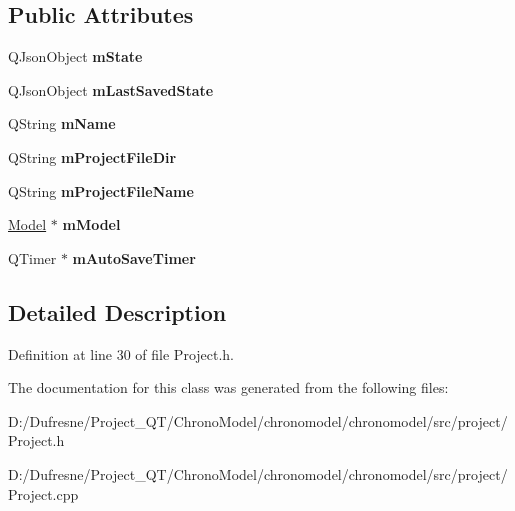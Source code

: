 \subsection*{Public Attributes}
\begin{DoxyCompactItemize}
\item 
\hypertarget{class_project_ad3a4b68e4e6c8145100cffcd846f9fa9}{Q\-Json\-Object {\bfseries m\-State}}\label{class_project_ad3a4b68e4e6c8145100cffcd846f9fa9}

\item 
\hypertarget{class_project_aaca6e90270eb9e26e8b91cdf7ca091c7}{Q\-Json\-Object {\bfseries m\-Last\-Saved\-State}}\label{class_project_aaca6e90270eb9e26e8b91cdf7ca091c7}

\item 
\hypertarget{class_project_ae6ca5c89b55a73bebd4ceb65e7b3181f}{Q\-String {\bfseries m\-Name}}\label{class_project_ae6ca5c89b55a73bebd4ceb65e7b3181f}

\item 
\hypertarget{class_project_a955938a4ac1984fb4f8678232660f32d}{Q\-String {\bfseries m\-Project\-File\-Dir}}\label{class_project_a955938a4ac1984fb4f8678232660f32d}

\item 
\hypertarget{class_project_a23a11e16ff7bedaf1da9ced7035e73d1}{Q\-String {\bfseries m\-Project\-File\-Name}}\label{class_project_a23a11e16ff7bedaf1da9ced7035e73d1}

\item 
\hypertarget{class_project_a62faa90f4b715474b11e236f2a65c709}{\hyperlink{class_model}{Model} $\ast$ {\bfseries m\-Model}}\label{class_project_a62faa90f4b715474b11e236f2a65c709}

\item 
\hypertarget{class_project_aa6a922e47e0f75e9dbf92eae8c205819}{Q\-Timer $\ast$ {\bfseries m\-Auto\-Save\-Timer}}\label{class_project_aa6a922e47e0f75e9dbf92eae8c205819}

\end{DoxyCompactItemize}


\subsection{Detailed Description}


Definition at line 30 of file Project.\-h.



The documentation for this class was generated from the following files\-:\begin{DoxyCompactItemize}
\item 
D\-:/\-Dufresne/\-Project\-\_\-\-Q\-T/\-Chrono\-Model/chronomodel/chronomodel/src/project/Project.\-h\item 
D\-:/\-Dufresne/\-Project\-\_\-\-Q\-T/\-Chrono\-Model/chronomodel/chronomodel/src/project/Project.\-cpp\end{DoxyCompactItemize}

